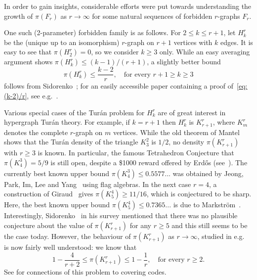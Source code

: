 \documentclass[10pt,a4paper]{article}
\numberwithin{equation}{section}
\theoremstyle{definition}
\theoremstyle{remark}
\begin{document}
In order to gain insights, considerable efforts were put towards understanding the growth of $\pi(F_r)$ as $r\to\infty$ for some natural sequences of forbidden $r$-graphs $F_r$. 

One such (2-parameter) forbidden family is as follows. For $2\le k\le r+1$, let $H_k^r$ be the (unique up to an isomorphism) $r$-graph on $r+1$ vertices with $k$ edges. It is easy to see that $\pi(H_2^r)=0$, so we consider $k\ge 3$ only. While an easy averaging argument shows $\pi(H_k^r)\le (k-1)/(r+1)$, a slightly better bound
\begin{equation}\label{eq:(k-2)/r}
	\pi(H_k^r)\le \frac{k-2}r,\quad \text{for every $r+1\ge k\ge 3$}
\end{equation}
follows from Sidorenko~\cite[Eq.~(7)]{Sidorenko82}; for an easily accessible paper containing a proof of~\eqref{eq:(k-2)/r}, see e.g.\ \cite[Corollary~3.9]{MarkstromThomassen21}.


Various special cases of the Tur\'an problem for $H_k^r$ are of great interest in hypergraph Tur\'an theory. For example, if $k=r+1$ then $H_k^r$ is $K_{r+1}^r$,  where $K_m^r$ denotes the complete $r$-graph on $m$ vertices. While the old theorem of Mantel~\cite{Mantel07} shows that the Tur\'an density of the triangle $K_3^2$ is $1/2$, no density $\pi(K_{r+1}^r)$ with $r\ge 3$ is known. In particular, the famous Tetrahedron Conjecture that $\pi(K_4^3)=5/9$ is still open, despite a \$1000 reward offered by Erd\H os (see~\cite[Page 260]{Furedi91}). The currently best known upper bound $\pi(K_4^3)\le 0.5577...$ was obtained by Jeong, Park, Im, Lee and Yang~\cite{JeongParkImLeeYang26x} using flag algebras.
In the next case $r=4$, a construction of Giraud~\cite{Giraud90} gives $\pi(K_5^4)\ge 11/16$, which is conjectured to be sharp. Here, the best known upper bound $\pi(K_5^4)\le 0.7365...$
is due to Markstr\"om~\cite{Markstrom09}. Interestingly,  Sidorenko~\cite{Sidorenko95} in his survey mentioned that there was no plausible conjecture about the value of $\pi(K_{r+1}^r)$ for any $r\ge 5$ and this still seems to be the case today. However, the behaviour of $\pi(K_{r+1}^r)$ as $r\to\infty$, studied in e.g.\ \cite{Sidorenko82,Decaen83ac,KimRoush83,TazawaShirakura83,FranklRodl85gc,Sidorenko97,ChungLu99,LuZhao09,Pikhurko25,GaoKuangPikhurkoWang26} is now fairly well understood: we know that 
$$
1-\frac{4}{r+2}\le \pi(K_{r+1}^r)\le 1-\frac1r,\quad\text{for every $r\ge2$}.
$$ 
See \cite{PikhurkoVerbitskyZhukovskii25,GaoKuangPikhurkoWang26} for connections of this problem to covering codes.
\end{document}
